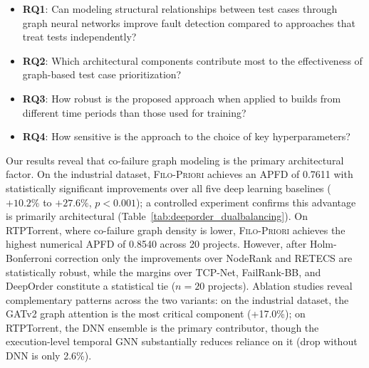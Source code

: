\documentclass[10pt,journal,compsoc]{IEEEtran}
\newcommand{\filopriori}{\textsc{Filo-Priori}}
\begin{document}
\begin{itemize}
    \item \textbf{RQ1}: Can modeling structural relationships between test cases
    through graph neural networks improve fault detection compared to approaches
    that treat tests independently?
    \item \textbf{RQ2}: Which architectural components contribute most to the
    effectiveness of graph-based test case prioritization?
    \item \textbf{RQ3}: How robust is the proposed approach when applied to builds
    from different time periods than those used for training?
    \item \textbf{RQ4}: How sensitive is the approach to the choice of key
    hyperparameters?
\end{itemize}

Our results reveal that co-failure graph modeling is the primary
architectural factor. On the industrial dataset, \filopriori{} achieves an
APFD of 0.7611 with statistically significant improvements over all five
deep learning baselines ($+10.2\%$ to $+27.6\%$, $p < 0.001$); a
controlled experiment confirms this advantage is primarily architectural
(Table~\ref{tab:deeporder_dualbalancing}). On RTPTorrent, where co-failure
graph density is lower, \filopriori{} achieves the highest numerical APFD
of 0.8540 across 20 projects. However, after Holm-Bonferroni correction
only the improvements over NodeRank and RETECS are statistically robust,
while the margins over TCP-Net, FailRank-BB, and DeepOrder constitute a
statistical tie ($n=20$ projects).
Ablation studies reveal complementary patterns across the two variants:
on the industrial dataset, the GATv2 graph attention is the most critical
component (+17.0\%); on RTPTorrent, the DNN ensemble is the primary
contributor, though the execution-level temporal GNN substantially reduces
reliance on it (drop without DNN is only 2.6\%).
\end{document}

